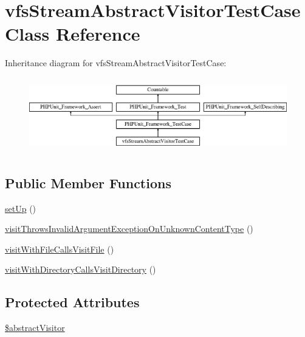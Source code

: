\hypertarget{classorg_1_1bovigo_1_1vfs_1_1visitor_1_1vfs_stream_abstract_visitor_test_case}{}\section{vfs\+Stream\+Abstract\+Visitor\+Test\+Case Class Reference}
\label{classorg_1_1bovigo_1_1vfs_1_1visitor_1_1vfs_stream_abstract_visitor_test_case}
Inheritance diagram for vfs\+Stream\+Abstract\+Visitor\+Test\+Case\+:\begin{figure}[H]
\begin{center}
\leavevmode
\includegraphics[height=3.303835cm]{classorg_1_1bovigo_1_1vfs_1_1visitor_1_1vfs_stream_abstract_visitor_test_case}
\end{center}
\end{figure}
\subsection*{Public Member Functions}
\begin{DoxyCompactItemize}
\item 
\mbox{\hyperlink{classorg_1_1bovigo_1_1vfs_1_1visitor_1_1vfs_stream_abstract_visitor_test_case_a0bc688732d2b3b162ffebaf7812e78da}{set\+Up}} ()
\item 
\mbox{\hyperlink{classorg_1_1bovigo_1_1vfs_1_1visitor_1_1vfs_stream_abstract_visitor_test_case_a3c83fe36a46c2f07f9ad65e9cca652e2}{visit\+Throws\+Invalid\+Argument\+Exception\+On\+Unknown\+Content\+Type}} ()
\item 
\mbox{\hyperlink{classorg_1_1bovigo_1_1vfs_1_1visitor_1_1vfs_stream_abstract_visitor_test_case_afcc19279fd69c6d92d67aff09314f7ec}{visit\+With\+File\+Calls\+Visit\+File}} ()
\item 
\mbox{\hyperlink{classorg_1_1bovigo_1_1vfs_1_1visitor_1_1vfs_stream_abstract_visitor_test_case_aa954fd9fac7d638b1262c8a711c2ed2f}{visit\+With\+Directory\+Calls\+Visit\+Directory}} ()
\end{DoxyCompactItemize}
\subsection*{Protected Attributes}
\begin{DoxyCompactItemize}
\item 
\mbox{\hyperlink{classorg_1_1bovigo_1_1vfs_1_1visitor_1_1vfs_stream_abstract_visitor_test_case_a78c1969fa37f1b05ac1b8176d00c07cf}{\$abstract\+Visitor}}
\end{DoxyCompactItemize}
